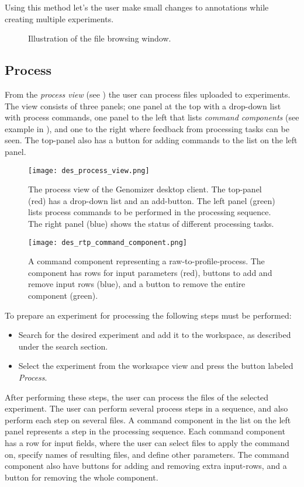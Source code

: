 Using this method let's the user make small changes to annotations while creating multiple experiments.

\begin{figure}[h]
	\caption{Illustration of the file browsing window.}
	\label{fig:des_upload}
\end{figure}
\FloatBarrier


\subsection{Process}
From the \textit{process view} (see ) the user can process files uploaded to experiments. The view consists of three panels; one panel at the top with a drop-down list with process commands, one panel to the left that lists \textit{command components} (see example in ), and one to the right where feedback from processing tasks can be seen. The top-panel also has a button for adding commands to the list on the left panel.

\begin{figure}[h]
	\texttt{[image: des\_process\_view.png]}
	\caption{The process view of the Genomizer desktop client. The top-panel (red) has a drop-down list and an add-button. The left panel (green) lists process commands to be performed in the processing sequence. The right panel (blue) shows the status of different processing tasks.}
	\label{fig:des_process-view}
\end{figure}

\begin{figure}[h]
	\texttt{[image: des\_rtp\_command\_component.png]}
	\caption{A command component representing a raw-to-profile-process. The component has rows for input parameters (red), buttons to add and remove input rows (blue), and a button to remove the entire component (green).}
	\label{fig:des_rtp-command-component}
\end{figure}

To prepare an experiment for processing the following steps must be performed:
\begin{itemize}
	\item Search for the desired experiment and add it to the workspace, as described under the search section.
	\item Select the experiment from the worksapce view and press the button labeled 	\textit{Process}.
\end{itemize}
After performing these steps, the user can process the files of the selected experiment. The user can perform several process steps in a sequence, and also perform each step on several files. A command component in the list on the left panel represents a step in the processing sequence. Each command component has a row for input fields, where the user can select files to apply the command on, specify names of resulting files, and define other parameters. The command component also have buttons for adding and removing extra input-rows, and a button for removing the whole component.

